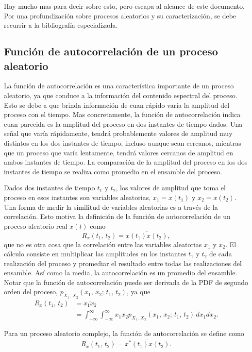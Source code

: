 \documentclass[a4paper]{article}
\begin{document}
Hay mucho mas para decir sobre esto, pero escapa al alcance de este documento. Por una profundización sobre procesos aleatorios y su caracterización, se debe recurrir a la bibliografía especializada.

\subsection{Función de autocorrelación de un proceso aleatorio}

La función de autocorrelación es una característica importante de un proceso aleatorio, ya que conduce a la información del contenido espectral del proceso. Esto se debe a que brinda información de cuan rápido varía la amplitud del proceso con el tiempo. Mas concretamente, la función de autocorrelación indica cuan parecida es la amplitud del proceso en dos instantes de tiempo dados. Una señal que varía rápidamente, tendrá probablemente valores de amplitud muy distintos en los dos instantes de tiempo, incluso aunque sean cercanos, mientras que un proceso que varía lentamente, tendrá valores cercanos de amplitud en ambos instantes de tiempo. La comparación de la amplitud del proceso en los dos instantes de tiempo se realiza como promedio en el ensamble del proceso.

Dados dos instantes de tiempo \(t_1\) y \(t_2\), los valores de amplitud que toma el proceso en esos instantes son variables aleatorias, \(x_1=x(t_1)\) y \(x_2=x(t_2)\). Una forma de medir la similitud de variables aleatorias es a través de la correlación. Esto motiva la definición de la función de autocorrelación de un proceso aleatorio real \(x(t)\) como
\[
 R_x(t_1,\,t_2) = \overline{x(t_1)x(t_2)},
\]
que no es otra cosa que la correlación entre las variables aleatorias \(x_1\) y \(x_2\). El cálculo consiste en multiplicar las amplitudes en los instantes \(t_1\) y \(t_2\) de cada realización del proceso y promediar el resultado entre todas las realizaciones del ensamble. Así como la media, la autocorrelación es un promedio del ensamble. Notar que la función de autocorrelación puede ser derivada de la PDF de segundo orden del proceso, \(p_{X_1,\,X_2}(x_1,\,x_2;\,t_1,\,t_2)\), ya que
\begin{align*}
 R_x(t_1,\,t_2) &= \overline{x_1x_2}\\
   &=\int_{-\infty}^{\infty}\int_{-\infty}^{\infty}x_1x_2p_{X_1,\,X_2}(x_1,\,x_2;\,t_1,\,t_2)\,dx_1dx_2.
\end{align*}

Para un proceso aleatorio complejo, la función de autocorrelación se define como 
\[
 R_x(t_1,\,t_2) = \overline{x^*(t_1)x(t_2)}.
\]
\end{document}

